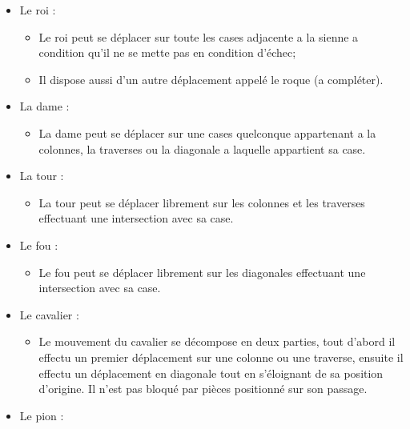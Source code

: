 \documentclass[12pt]{article}
\begin{document}
\begin{itemize}
\itemsep1pt\parskip0pt
\item
  Le roi :

  \begin{itemize}
  \itemsep1pt\parskip0pt
  \item
    Le roi peut se déplacer sur toute les cases adjacente a la sienne a
    condition qu'il ne se mette pas en condition d'échec;
  \item
    Il dispose aussi d'un autre déplacement appelé le roque (a
    compléter).
  \end{itemize}
\item
  La dame :

  \begin{itemize}
  \itemsep1pt\parskip0pt
  \item
    La dame peut se déplacer sur une cases quelconque appartenant a la
    colonnes, la traverses ou la diagonale a laquelle appartient sa
    case.
  \end{itemize}
\item
  La tour :

  \begin{itemize}
  \itemsep1pt\parskip0pt
  \item
    La tour peut se déplacer librement sur les colonnes et les traverses
    effectuant une intersection avec sa case.
  \end{itemize}
\item
  Le fou :

  \begin{itemize}
  \itemsep1pt\parskip0pt
  \item
    Le fou peut se déplacer librement sur les diagonales effectuant une
    intersection avec sa case.
  \end{itemize}
\item
  Le cavalier :

  \begin{itemize}
  \itemsep1pt\parskip0pt
  \item
    Le mouvement du cavalier se décompose en deux parties, tout d'abord
    il effectu un premier déplacement sur une colonne ou une traverse,
    ensuite il effectu un déplacement en diagonale tout en s'éloignant
    de sa position d'origine. Il n'est pas bloqué par pièces positionné
    sur son passage.
  \end{itemize}
\item
  Le pion :


\end{itemize}
\end{document}
